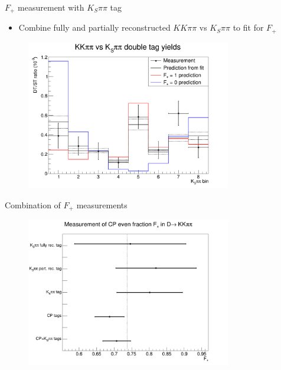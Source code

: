 \documentclass{beamer}
\begin{document}
\begin{frame}{$F_+$ measurement with $K_S\pi\pi$ tag}
  \begin{itemize}
    \item{Combine fully and partially reconstructed $KK\pi\pi$ vs $K_S\pi\pi$ to fit for $F_+$}
  \end{itemize}
  \begin{figure}
    \includegraphics[width = 0.8\textwidth]{Plots/CPeven_fraction_combination_KSpipi.png}
  \end{figure}
\end{frame}

\begin{frame}{Combination of $F_+$ measurements}
  \begin{figure}
    \includegraphics[width = 0.8\textwidth]{Plots/FPlus_combination_comparison.png}
  \end{figure}
\end{frame}
\end{document}
